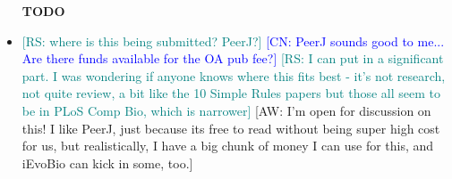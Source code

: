 \newcommand{\aw}[1]{{\textcolor{armygreen}{[AW: #1]}}} %
\newcommand{\sarah}[1]{{\textcolor{amethyst}{[SF: #1]}}} %
\newcommand{\rs}[1]{{\textcolor{teal}{[RS: #1]}}} %
\newcommand{\rsedit}[2]{\sout{#1}{\color{teal}{#2}}}
\newcommand{\jo}[1]{{\textcolor{pauburn}{[JO: #1]}}} %
\newcommand{\jedit}[2]{\sout{#1}{\color{pauburn}{#2}}}
\newcommand{\cn}[1]{{\textcolor{blue}{[CN: #1]}}} %

\begin{itemize}
\item [\textbf{TODO}]
    \item \rs{where is this being submitted? PeerJ?} \cn{PeerJ sounds good to me... Are there funds available for the OA pub fee?} \rs{I can put in a significant part. I was wondering if anyone knows where this fits best - it's not research, not quite review, a bit like the 10 Simple Rules papers but those all seem to be in PLoS Comp Bio, which is narrower} \aw{I'm open for discussion on this! I like PeerJ, just because its free to read without being super high cost for us, but realistically, I have a big chunk of money I can use for this, and iEvoBio can kick in some, too.}

\end{itemize}
